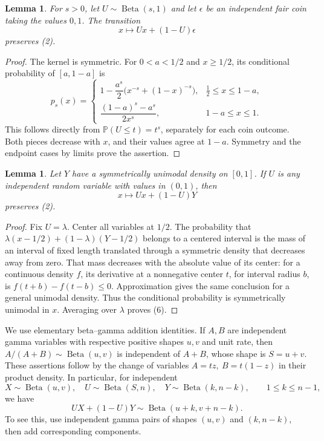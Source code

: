 \documentclass[10pt]{article}
\newtheorem{lemma}[theorem]{Lemma}
\newcommand{\PP}{\mathbb P}
\newcommand{\Be}{\operatorname{Beta}}
\begin{document}
\begin{lemma}\label{lem:coin}
For \(s>0\), let \(U\sim\Be(s,1)\) and let \(\epsilon\) be an independent
fair coin taking the values \(0,1\). The transition
\[
 x\longmapsto Ux+(1-U)\epsilon
 \tag{4}
\]
preserves (2).
\end{lemma}
\begin{proof}
The kernel is symmetric. For \(0<a<1/2\) and \(x\ge1/2\), its conditional
probability of \([a,1-a]\) is
\[
 p_s(x)=
 \begin{cases}
 1-\dfrac{a^s}{2}\bigl(x^{-s}+(1-x)^{-s}\bigr),
                          &\frac12\le x\le1-a,\\[4pt]
 \dfrac{(1-a)^s-a^s}{2x^s},&1-a\le x\le1.
 \end{cases}                                           \tag{5}
\]
This follows directly from \(\PP(U\le t)=t^s\), separately for each
coin outcome. Both pieces decrease with \(x\), and their values agree
at \(1-a\). Symmetry and the endpoint cases by limits prove the assertion.
\end{proof}

\begin{lemma}\label{lem:convolution}
Let \(Y\) have a symmetrically unimodal density on \([0,1]\). If \(U\)
is any independent random variable with values in \((0,1)\), then
\[
 x\longmapsto Ux+(1-U)Y
 \tag{6}
\]
preserves (2).
\end{lemma}
\begin{proof}
Fix \(U=\lambda\). Center all variables at \(1/2\). The probability that
\(\lambda(x-1/2)+(1-\lambda)(Y-1/2)\) belongs to a centered interval
is the mass of an interval of fixed length translated through a symmetric
density that decreases away from zero. That mass decreases with the
absolute value of its center: for a continuous density \(f\), its
derivative at a nonnegative center \(t\), for interval radius \(b\), is
\(f(t+b)-f(t-b)\le0\). Approximation gives the same conclusion for a
general unimodal density. Thus the conditional probability is
symmetrically unimodal in \(x\). Averaging over \(\lambda\) proves (6).
\end{proof}

We use elementary beta--gamma addition identities. If \(A,B\) are
independent gamma variables with respective positive shapes \(u,v\)
and unit rate, then \(A/(A+B)\sim\Be(u,v)\) is independent of
\(A+B\), whose shape is \(S=u+v\). These assertions follow by the change
of variables \(A=tz,\ B=t(1-z)\) in their product density. In particular,
for independent
\[
 X\sim\Be(u,v),\quad U\sim\Be(S,n),\quad
 Y\sim\Be(k,n-k),\qquad 1\le k\le n-1,
\]
we have
\[
 UX+(1-U)Y\sim\Be(u+k,v+n-k).                \tag{7}
\]
To see this, use independent gamma pairs of shapes \((u,v)\) and
\((k,n-k)\), then add corresponding components.
\end{document}
